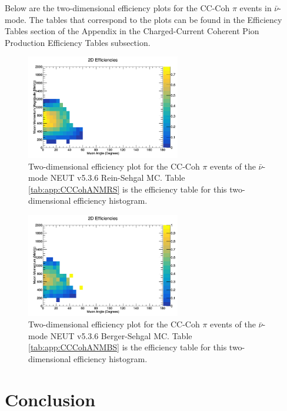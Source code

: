 \documentclass[11pt]{article}
\begin{document}
Below are the two-dimensional efficiency plots for the CC-Coh $\pi$ events in $\bar{\nu}$-mode. The tables that correspond to the plots can be found in the Efficiency Tables section of the Appendix in the Charged-Current Coherent Pion Production Efficiency Tables subsection.

\begin{figure}[H]
\centering
\includegraphics[width=0.6\textwidth]{CCCohPlots/2DEffANMRS.png}
\caption{Two-dimensional efficiency plot for the CC-Coh $\pi$ events of the $\bar{\nu}$-mode NEUT v5.3.6 Rein-Sehgal MC. Table \ref*{tab:app:CCCohANMRS} is the efficiency table for this two-dimensional efficiency histogram.}
\label{fig:TwoDEfficiencyCCCohANMRS}
\end{figure}

\begin{figure}[H]
\centering
\includegraphics[width=0.6\textwidth]{CCCohPlots/2DEffANMBS.png}
\caption{Two-dimensional efficiency plot for the CC-Coh $\pi$ events of the $\bar{\nu}$-mode NEUT v5.3.6 Berger-Sehgal MC. Table \ref*{tab:app:CCCohANMBS} is the efficiency table for this two-dimensional efficiency histogram.}
\label{fig:TwoDEfficiencyCCCohANMBS}
\end{figure}


\section{Conclusion}
\label{sec:conclusion}
\end{document}
